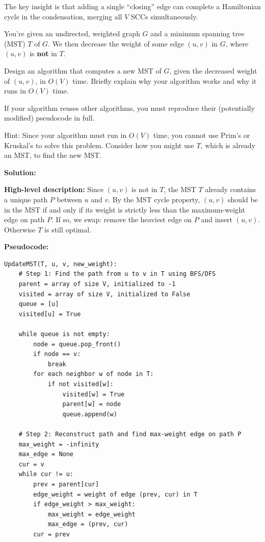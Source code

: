 \documentclass[addpoints]{exam}
\begin{document}
\begin{questions}
\begin{parts}
The key insight is that adding a single ``closing'' edge can complete a Hamiltonian cycle in the condensation, merging all $V$ SCCs simultaneously.

%

\end{parts}


\question[20] You're given an undirected, weighted graph $G$ and a minimum spanning tree (MST) $T$ of $G$. We then decrease the weight of some edge $(u, v)$ in $G$, where $(u, v)$ is \textbf{not} in $T$.

Design an algorithm that computes a new MST of $G$, given the decreased weight of $(u, v)$, in $O(V)$ time. Briefly explain why your algorithm works and why it runs in $O(V)$ time.

If your algorithm reuses other algorithms, you must reproduce their (potentially modified) pseudocode in full.

Hint: Since your algorithm must run in $O(V)$ time, you cannot use Prim's or Kruskal's to solve this problem. Consider how you might use $T$, which is already an MST, to find the new MST.

\textbf{Solution:}

\textbf{High-level description:} Since $(u, v)$ is not in $T$, the MST $T$ already contains a unique path $P$ between $u$ and $v$. By the MST cycle property, $(u,v)$ should be in the MST if and only if its weight is strictly less than the maximum-weight edge on path $P$. If so, we swap: remove the heaviest edge on $P$ and insert $(u, v)$. Otherwise $T$ is still optimal.

\textbf{Pseudocode:}

\begin{verbatim}
UpdateMST(T, u, v, new_weight):
    # Step 1: Find the path from u to v in T using BFS/DFS
    parent = array of size V, initialized to -1
    visited = array of size V, initialized to False
    queue = [u]
    visited[u] = True

    while queue is not empty:
        node = queue.pop_front()
        if node == v:
            break
        for each neighbor w of node in T:
            if not visited[w]:
                visited[w] = True
                parent[w] = node
                queue.append(w)

    # Step 2: Reconstruct path and find max-weight edge on path P
    max_weight = -infinity
    max_edge = None
    cur = v
    while cur != u:
        prev = parent[cur]
        edge_weight = weight of edge (prev, cur) in T
        if edge_weight > max_weight:
            max_weight = edge_weight
            max_edge = (prev, cur)
        cur = prev


\end{verbatim}
\end{questions}
\end{document}

